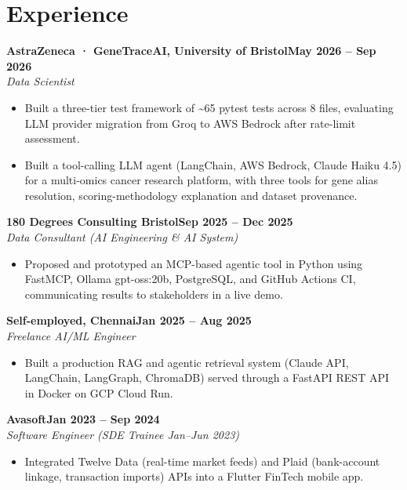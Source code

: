 \documentclass[a4paper,10pt]{article}
\newcommand{\entry}[4]{\noindent\textbf{#1}\hfill\textbf{#2}\\ \textit{#3}\hfill\textit{#4}\par}
\begin{document}
\section{Experience}
\entry{AstraZeneca · GeneTraceAI, University of Bristol}{May 2026 – Sep 2026}{Data Scientist}{}
\begin{itemize}
  \item Built a three-tier test framework of \textasciitilde{}65 pytest tests across 8 files, evaluating LLM provider migration from Groq to AWS Bedrock after rate-limit assessment.
  \item Built a tool-calling LLM agent (LangChain, AWS Bedrock, Claude Haiku 4.5) for a multi-omics cancer research platform, with three tools for gene alias resolution, scoring-methodology explanation and dataset provenance.
\end{itemize}
\vspace{3pt}
\entry{180 Degrees Consulting Bristol}{Sep 2025 – Dec 2025}{Data Consultant (AI Engineering \& AI System)}{}
\begin{itemize}
  \item Proposed and prototyped an MCP-based agentic tool in Python using FastMCP, Ollama gpt-oss:20b, PostgreSQL, and GitHub Actions CI, communicating results to stakeholders in a live demo.
\end{itemize}
\vspace{3pt}
\entry{Self-employed, Chennai}{Jan 2025 – Aug 2025}{Freelance AI/ML Engineer}{}
\begin{itemize}
  \item Built a production RAG and agentic retrieval system (Claude API, LangChain, LangGraph, ChromaDB) served through a FastAPI REST API in Docker on GCP Cloud Run.
\end{itemize}
\vspace{3pt}
\entry{Avasoft}{Jan 2023 – Sep 2024}{Software Engineer (SDE Trainee Jan–Jun 2023)}{}
\begin{itemize}
  \item Integrated Twelve Data (real-time market feeds) and Plaid (bank-account linkage, transaction imports) APIs into a Flutter FinTech mobile app.
\end{itemize}

\end{document}

